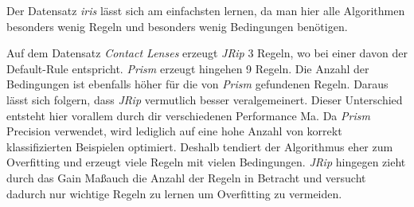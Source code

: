 Der Datensatz \emph{iris} l\"asst sich am einfachsten lernen, da man hier alle Algorithmen besonders wenig Regeln und besonders wenig Bedingungen ben\"otigen.

Auf dem Datensatz \emph{Contact Lenses} erzeugt \emph{JRip} 3 Regeln, wo bei einer davon der Default-Rule entspricht. \emph{Prism} erzeugt hingehen 9 Regeln. Die Anzahl der Bedingungen ist ebenfalls h\"oher f\"ur die von \emph{Prism} gefundenen Regeln. Daraus l\"asst sich folgern, dass \emph{JRip} vermutlich besser veralgemeinert. 
Dieser Unterschied entsteht hier vorallem durch dir verschiedenen Performance Ma\sse. Da \emph{Prism} Precision verwendet, wird lediglich auf eine hohe Anzahl von korrekt klassifizierten Beispielen optimiert. Deshalb tendiert der Algorithmus eher zum Overfitting und erzeugt viele Regeln mit vielen Bedingungen. \emph{JRip} hingegen zieht durch das Gain Ma\ss auch die Anzahl der Regeln in Betracht und versucht dadurch nur wichtige Regeln zu lernen um Overfitting zu vermeiden.
